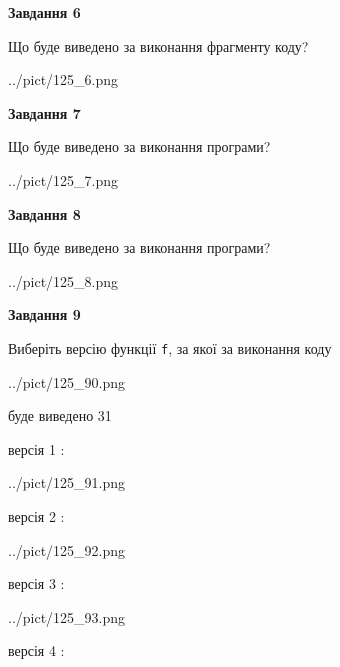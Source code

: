 \documentclass[12pt, ukrainian]{article}
\def\code#1{\Verb!#1!}
\begin{document}
{\begin {large}
{\begin {center}\textbf{Завдання 6}\end {center}}

Що буде виведено за виконання фрагменту коду?\par
\begin{center}
	{../pict/125_6.png}
\end{center}
\newpage

{\begin {center}\textbf{Завдання 7}\end {center}}

Що буде виведено за виконання програми?\par
\begin{center}
	{../pict/125_7.png}
\end{center}
\newpage

{\begin {center}\textbf{Завдання 8}\end {center}}

Що буде виведено за виконання програми?\par
\begin{center}
	{../pict/125_8.png}
\end{center}
\newpage

{\begin {center}\textbf{Завдання 9}\end {center}}

Виберіть версію функції \code{f}, за якої за виконання коду
\begin{center}
	{../pict/125_90.png}
\end{center}
буде виведено 31

\vspace{5mm}
версія 1 :

\begin{center}
	{../pict/125_91.png}
\end{center}
версія 2 :

\begin{center}
	{../pict/125_92.png}
\end{center}
версія 3 :

\begin{center}
	{../pict/125_93.png}
\end{center}
версія 4 :


\end{large}}
\end{document}
